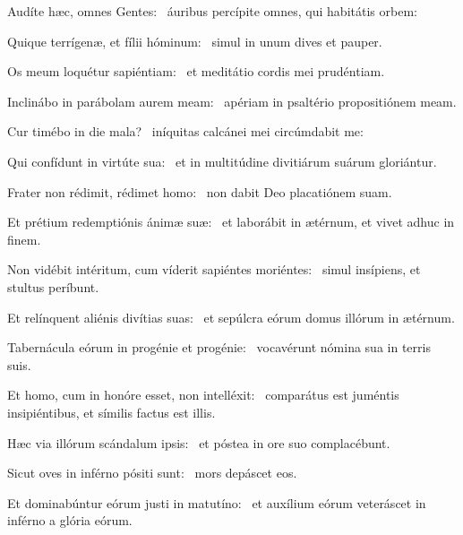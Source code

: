 \item Audíte hæc, omnes Gentes:~\psstar{} áuribus percípite omnes, qui habitátis orbem:

\item Quique terrígenæ, et fílii hóminum:~\psstar{} simul in unum dives et pauper.

\item Os meum loquétur sapiéntiam:~\psstar{} et meditátio cordis mei prudéntiam.

\item Inclinábo in parábolam aurem meam:~\psstar{} apériam in psaltério propositiónem meam.

\item Cur timébo in die mala?~\psstar{} iníquitas calcánei mei circúmdabit me:

\item Qui confídunt in virtúte sua:~\psstar{} et in multitúdine divitiárum suárum gloriántur.

\item Frater non rédimit, rédimet homo:~\psstar{} non dabit Deo placatiónem suam.

\item Et prétium redemptiónis ánimæ suæ:~\psstar{} et laborábit in ætérnum, et vivet adhuc in finem.

\item Non vidébit intéritum, cum víderit sapiéntes moriéntes:~\psstar{} simul insípiens, et stultus períbunt.

\item Et relínquent aliénis divítias suas:~\psstar{} et sepúlcra eórum domus illórum in ætérnum.

\item Tabernácula eórum in progénie et progénie:~\psstar{} vocavérunt nómina sua in terris suis.

\item Et homo, cum in honóre esset, non intelléxit:~\psstar{} comparátus est juméntis insipiéntibus, et símilis factus est illis.

\item Hæc via illórum scándalum ipsis:~\psstar{} et póstea in ore suo complacébunt.

\item Sicut oves in inférno pósiti sunt:~\psstar{} mors depáscet eos.

\item Et dominabúntur eórum justi in matutíno:~\psstar{} et auxílium eórum veteráscet in inférno a glória eórum.

